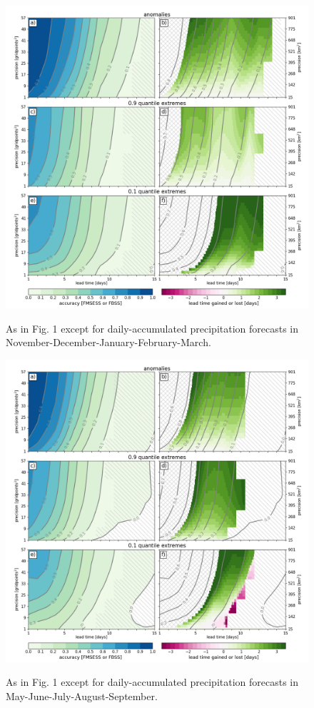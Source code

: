 \documentclass[preprint,12pt,authoryear]{elsarticle}
\begin{document}
\newpage
\begin{figure}[t]
  \noindent\includegraphics[scale=0.45]{fig_S1.png}\\
  \caption{As in Fig. 1 except for daily-accumulated precipitation forecasts in November-December-January-February-March.}\label{f1}
\end{figure}

\newpage
\begin{figure}[t]
  \noindent\includegraphics[scale=0.45]{fig_S2.png}\\
  \caption{As in Fig. 1 except for daily-accumulated precipitation forecasts in May-June-July-August-September.}\label{f2}
\end{figure}
\end{document}
